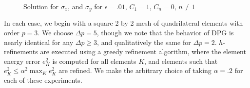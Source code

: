 \begin{figure}[h!]
\centering
{}
\caption{Solution for $\sigma_x$, and $\sigma_y$ for $\epsilon = .01$, $C_1 = 1$, $C_n=0$, $n\neq 1$}
\end{figure}
In each case, we begin with a square 2 by 2 mesh of quadrilateral elements with order $p=3$.  We choose $\Delta p = 5$, though we note that the behavior of DPG is nearly identical for any $\Delta p \geq 3$, and qualitatively the same for $\Delta p = 2$.  $h$-refinements are executed using a greedy refinement algorithm, where the element energy error $e_K^2$ is computed for all elements $K$, and elements such that $e_K^2 \leq \alpha^2 \max_K e_K^2$ are refined.  We make the arbitrary choice of taking $\alpha = .2$ for each of these experiments.  

